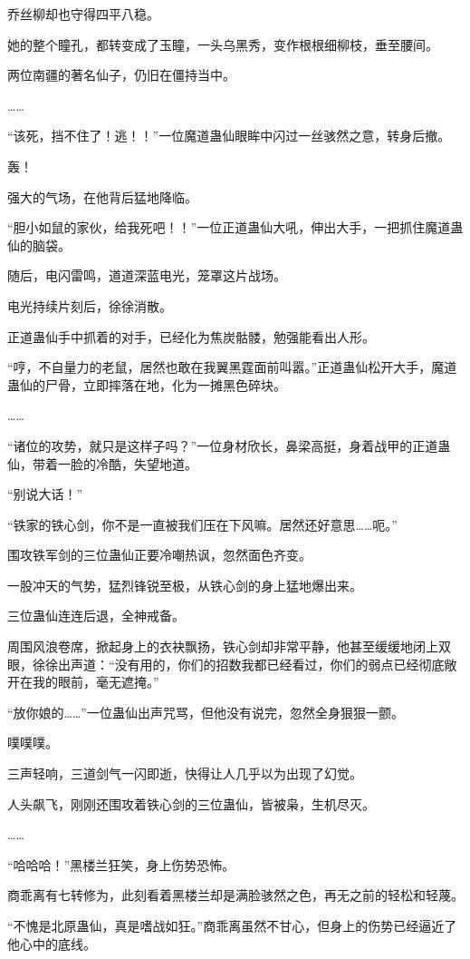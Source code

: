 \begin{this_body}
乔丝柳却也守得四平八稳。

她的整个瞳孔，都转变成了玉瞳，一头乌黑秀，变作根根细柳枝，垂至腰间。

两位南疆的著名仙子，仍旧在僵持当中。

……

“该死，挡不住了！逃！！”一位魔道蛊仙眼眸中闪过一丝骇然之意，转身后撤。

轰！

强大的气场，在他背后猛地降临。

“胆小如鼠的家伙，给我死吧！！”一位正道蛊仙大吼，伸出大手，一把抓住魔道蛊仙的脑袋。

随后，电闪雷鸣，道道深蓝电光，笼罩这片战场。

电光持续片刻后，徐徐消散。

正道蛊仙手中抓着的对手，已经化为焦炭骷髅，勉强能看出人形。

“哼，不自量力的老鼠，居然也敢在我翼黑霆面前叫嚣。”正道蛊仙松开大手，魔道蛊仙的尸骨，立即摔落在地，化为一摊黑色碎块。

……

“诸位的攻势，就只是这样子吗？”一位身材欣长，鼻梁高挺，身着战甲的正道蛊仙，带着一脸的冷酷，失望地道。

“别说大话！”

“铁家的铁心剑，你不是一直被我们压在下风嘛。居然还好意思……呃。”

围攻铁军剑的三位蛊仙正要冷嘲热讽，忽然面色齐变。

一股冲天的气势，猛烈锋锐至极，从铁心剑的身上猛地爆出来。

三位蛊仙连连后退，全神戒备。

周围风浪卷席，掀起身上的衣袂飘扬，铁心剑却非常平静，他甚至缓缓地闭上双眼，徐徐出声道：“没有用的，你们的招数我都已经看过，你们的弱点已经彻底敞开在我的眼前，毫无遮掩。”

“放你娘的……”一位蛊仙出声咒骂，但他没有说完，忽然全身狠狠一颤。

噗噗噗。

三声轻响，三道剑气一闪即逝，快得让人几乎以为出现了幻觉。

人头飙飞，刚刚还围攻着铁心剑的三位蛊仙，皆被枭，生机尽灭。

……

“哈哈哈！”黑楼兰狂笑，身上伤势恐怖。

商乖离有七转修为，此刻看着黑楼兰却是满脸骇然之色，再无之前的轻松和轻蔑。

“不愧是北原蛊仙，真是嗜战如狂。”商乖离虽然不甘心，但身上的伤势已经逼近了他心中的底线。


\end{this_body}
